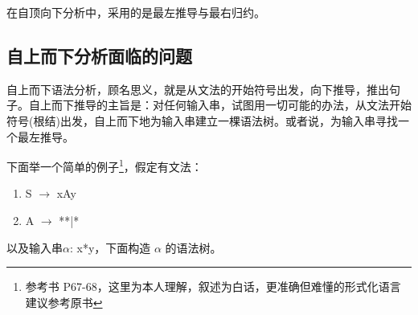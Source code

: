 在自顶向下分析中，采用的是最左推导与最右归约。




\subsection{自上而下分析面临的问题}

自上而下语法分析，顾名思义，就是从文法的开始符号出发，向下推导，推出句子。自上而下推导的主旨是：对任何输入串，试图用一切可能的办法，从文法开始符号(根结)出发，自上而下地为输入串建立一棵语法树。或者说，为输入串寻找一个最左推导。

下面举一个简单的例子\footnote{参考书 P67-68，这里为本人理解，叙述为白话，更准确但难懂的形式化语言建议参考原书}，假定有文法：
\begin{enumerate}
    \item[(1)] S $\rightarrow$ xAy
    \item[(2)] A $\rightarrow$ **|*
\end{enumerate}

以及输入串$\alpha$: x*y，下面构造 $\alpha$ 的语法树。 

